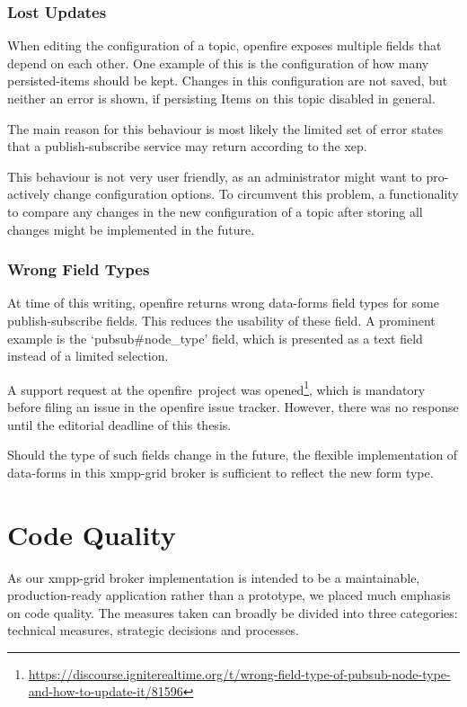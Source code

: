 \subsubsection{Lost Updates}

When editing the configuration of a \gls{topic}, openfire exposes multiple fields that depend on each other.
One example of this is the configuration of how many \glspl{persisted-item} should be kept.
Changes in this configuration are not saved, but neither an error is shown, if persisting Items on this \gls{topic} disabled in general.

The main reason for this behaviour is most likely the limited set of error states that a \gls{publish-subscribe} service may return according to the \gls{xep}. \cite{xep-0060}

This behaviour is not very user friendly, as an administrator might want to pro-actively change configuration options. To circumvent this problem, a functionality to compare any changes in the new configuration of a topic after storing all changes might be implemented in the future.

\subsubsection{Wrong Field Types}

At time of this writing, openfire returns wrong \gls{data-forms} field types for some \gls{publish-subscribe} fields.
 This reduces the usability of these field.
A prominent example is the `pubsub\#node\_type' field, which is presented as a text field instead of a limited selection.

A support request at the openfire~project was opened\footnote{\url{https://discourse.igniterealtime.org/t/wrong-field-type-of-pubsub-node-type-and-how-to-update-it/81596}},
which is mandatory before filing an issue in the openfire issue tracker.
However, there was no response until the editorial deadline of this thesis.

Should the type of such fields change in the future, the flexible implementation of \gls{data-forms} in this \gls{xmpp-grid} \gls{broker} is sufficient to reflect the new form type.

\section{Code Quality}
As our \gls{xmpp-grid} \gls{broker} implementation is intended to be a maintainable, production-ready application rather than a prototype, we placed much emphasis on code quality.
The measures taken can broadly be divided into three categories: technical measures, strategic decisions and processes.

